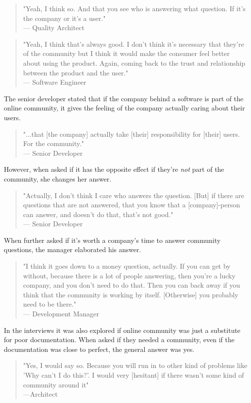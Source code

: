 \documentclass{cslthse-msc}
\begin{document}
    \begin{quote}
        "Yeah, I think so. And that you see who is answering what question. If it's the company or it's a user."\\--- Quality Architect
    \end{quote}
    \begin{quote}
        "Yeah, I think that's always good. I don't think it's necessary that they're of the community but I think it would make the consumer feel better about using the product. Again, coming back to the trust and relationship between the product and the user."\\--- Software Engineer
    \end{quote}
    The senior developer stated that if the company behind a software is part of the online community, it gives the feeling of the company actually caring about their users.
    \begin{quote}
        "...that [the company] actually take [their] responsibility for [their] users. For the community." \\--- Senior Developer
    \end{quote}
    However, when asked if it has the opposite effect if they're \textit{not} part of the community, she changes her answer.
    \begin{quote}
        "Actually, I don't think I care who answers the question. [But] if there are questions that are not answered, that you know that a [company]-person can answer, and doesn't do that, that's not good."\\--- Senior Developer
    \end{quote}
    When further asked if it's worth a company's time to answer community questions, the manager elaborated his answer.
    \begin{quote}
        "I think it goes down to a money question, actually. If you can get by without, because there is a lot of people answering, then  you're a lucky company, and you don't need to do that. Then you can back away if you think that the community is working by itself. [Otherwise] you probably need to be there."\\--- Development Manager
    \end{quote}
    In the interviews it was also explored if online community was just a substitute for poor documentation. When asked if they needed a community, even if the documentation was close to perfect, the general answer was yes.
    \begin{quote}
        "Yes, I would say so. Because you will run in to other kind of problems like 'Why can't I do this?'. I would very [hesitant] if there wasn't some kind of community around it"\\---Architect
    \end{quote}
\end{document}
